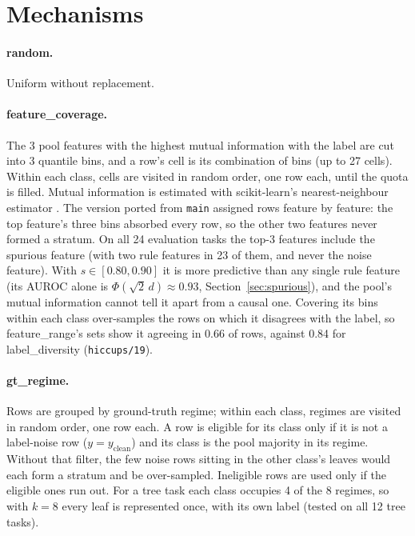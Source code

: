 \documentclass[11pt,a4paper]{article}
\newcommand{\1}{\mathbf{1}}
\theoremstyle{plain}
\theoremstyle{definition}
\theoremstyle{remark}
\newcommand{\status}[1]{\par\noindent\hfill\fcolorbox{black!35}{black!4}{\scriptsize\sffamily Status: #1}\par\medskip}
\begin{document}
\section{Mechanisms}
\status{Implemented (P1, P3)}

\paragraph{random.} Uniform without replacement.

\paragraph{feature\_coverage.} The 3 pool features with the highest mutual
information with the label are cut into 3 quantile bins, and a row's cell is
its combination of bins (up to 27 cells). Within each class, cells are
visited in random order, one row each, until the quota is filled. Mutual
information is estimated with scikit-learn's nearest-neighbour estimator
\citep{pedregosa2011scikit,kraskov2004estimating,ross2014mutual}. The version
ported from \texttt{main} assigned rows feature by feature: the top feature's
three bins absorbed every row, so the other two features never formed a
stratum. On all 24 evaluation tasks the top-3 features include the spurious
feature (with two rule features in 23 of them, and never the noise feature).
With $s \in [0.80, 0.90]$ it is more predictive than any single rule feature
(its AUROC alone is $\Phi(\sqrt 2\, d) \approx 0.93$,
Section~\ref{sec:spurious}), and the pool's mutual information cannot tell it
apart from a causal one. Covering its bins within each class over-samples the
rows on which it disagrees with the label, so feature\_range's sets show it
agreeing in 0.66 of rows, against 0.84 for label\_diversity
(\texttt{hiccups/19}).

\paragraph{gt\_regime.} Rows are grouped by ground-truth regime; within each
class, regimes are visited in random order, one row each. A row is eligible
for its class only if it is not a label-noise row
($y = y_{\mathrm{clean}}$) and its class is the pool majority in its regime.
Without that filter, the few noise rows sitting in the other class's leaves
would each form a stratum and be over-sampled. Ineligible rows are used only
if the eligible ones run out. For a tree task each class occupies 4 of the 8
regimes, so with $k = 8$ every leaf is represented once, with its own label
(tested on all 12 tree tasks).
\end{document}
